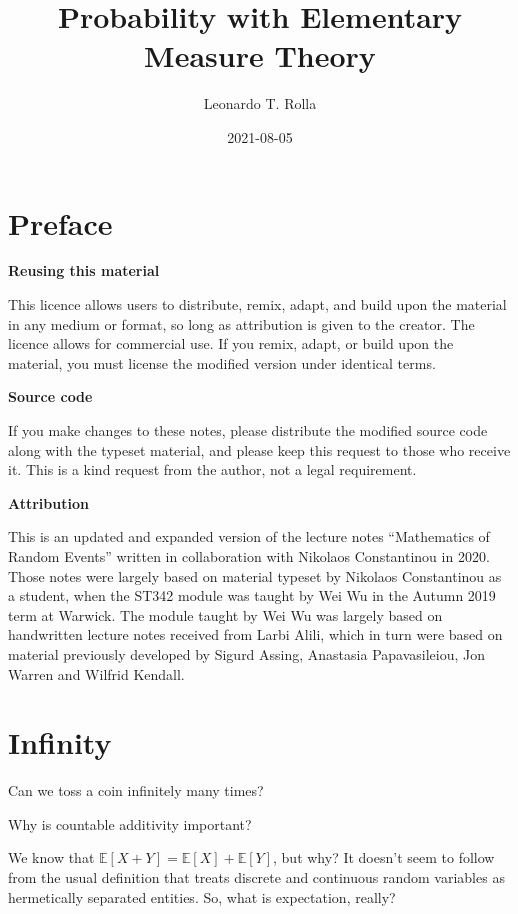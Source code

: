 \documentclass[
]{book}
\title{Probability with Elementary Measure Theory}
\author{Leonardo T. Rolla}
\date{2021-08-05}
\newcommand{\E}{\mathbb{E}}
\theoremstyle{definition}
\theoremstyle{definition}
\theoremstyle{definition}
\theoremstyle{definition}
\theoremstyle{remark}
\begin{document}
\maketitle

{
\setcounter{tocdepth}{1}
\tableofcontents
}
\hypertarget{preface}{%
\chapter*{Preface}\label{preface}}

\textbf{Reusing this material}

This licence allows users to distribute, remix, adapt, and build upon
the material in any medium or format, so long as attribution is given to
the creator. The licence allows for commercial use. If you remix, adapt,
or build upon the material, you must license the modified version under
identical terms.

\textbf{Source code}

If you make changes to these notes, please distribute the modified
source code along with the typeset material, and please keep this
request to those who receive it. This is a kind request from the author,
not a legal requirement.

\textbf{Attribution}

This is an updated and expanded version of the lecture notes
``Mathematics of Random Events'' written in collaboration with Nikolaos
Constantinou in 2020. Those notes were largely based on material typeset
by Nikolaos Constantinou as a student, when the ST342 module was taught
by Wei Wu in the Autumn 2019 term at Warwick. The module taught by Wei
Wu was largely based on handwritten lecture notes received from Larbi
Alili, which in turn were based on material previously developed by
Sigurd Assing, Anastasia Papavasileiou, Jon Warren and Wilfrid Kendall.

\hypertarget{sec:intro}{%
\chapter{Infinity}\label{sec:intro}}

Can we toss a coin infinitely many times?

Why is countable additivity important?

We know that \(\E[X+Y]=\E[X] + \E[Y]\), but why? It doesn't seem to follow
from the usual definition that treats discrete and continuous random
variables as hermetically separated entities. So, what is expectation,
really?
\end{document}
